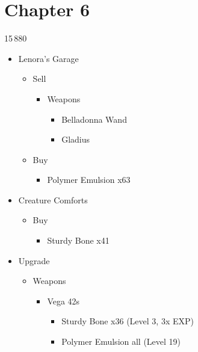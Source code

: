 \chapter{Chapter 6}


\begin{shop}{15\,880}
		\begin{itemize}
			\item Lenora's Garage
			      \begin{itemize}
				      \item Sell
				            \begin{itemize}
					            \item Weapons
					                  \begin{itemize}
						                  \item Belladonna Wand
						                  \item Gladius
					                  \end{itemize}
				            \end{itemize}
				      \item Buy
				            \begin{itemize}
					            \item Polymer Emulsion x63
				            \end{itemize}
			      \end{itemize}
			\item Creature Comforts
			      \begin{itemize}
				      \item Buy
				            \begin{itemize}
					            \item Sturdy Bone x41
				            \end{itemize}
			      \end{itemize}
		\end{itemize}
\end{shop}

\begin{upgrade}
	\begin{itemize}
		\item Upgrade
		      \begin{itemize}
			      \item Weapons
			            \begin{itemize}
				            \item Vega 42s
				                  \begin{itemize}
					                  \item Sturdy Bone x36 (Level 3, 3x EXP)
					                  \item Polymer Emulsion all (Level 19)
				                  \end{itemize}
			            \end{itemize}
		      \end{itemize}
	\end{itemize}
\end{upgrade}


